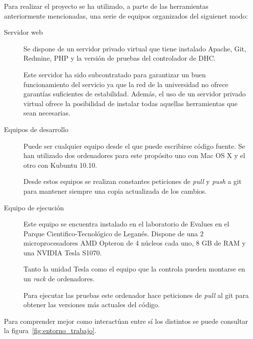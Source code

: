 Para realizar el proyecto se ha utilizado, a parte de las herramientas anteriormente mencionadas, una serie de equipos organizados del siguienet modo:

\begin{description}
	\item[Servidor web] Se dispone de un servidor privado virtual que tiene instalado Apache, Git, Redmine, PHP y la versión de pruebas del controlador de DHC.
	
	Este servidor ha sido subcontratado para garantizar un buen funcionamiento del servicio ya que la red de la universidad no ofrece garantías suficientes de estabilidad. Además, el uso de un servidor privado virtual ofrece la posibilidad de instalar todas aquellas herramientas que sean necesarias.
	
	\item[Equipos de desarrollo] Puede ser cualquier equipo desde el que puede escribirse código fuente. Se han utilizado dos ordenadores para este propósito uno con Mac OS X y el otro con Kubuntu 10.10.
	
	Desde estos equipos se realizan constantes peticiones de \emph{pull} y \emph{push} a git para mantener siempre una copia actualizada de los cambios.
	
	\item[Equipo de ejecución] Este equipo se encuentra instalado en el laboratorio de Evalues en el Parque Cientifico-Tecnológico de Leganés. Dispone de una 2 microprocesadores AMD Opteron de 4 núcleos cada uno, 8 GB de RAM y una NVIDIA Tesla S1070.
	
	Tanto la unidad Tesla como el equipo que la controla pueden montarse en un \emph{rack} de ordenadores.
	
	Para ejecutar las pruebas este ordenador hace peticiones de \emph{pull} al git para obtener las versiones más actuales del código.
\end{description}

Para comprender mejor como interactúan entre sí los distintos se puede consultar la figura~\ref{fig:entorno_trabajo}.

